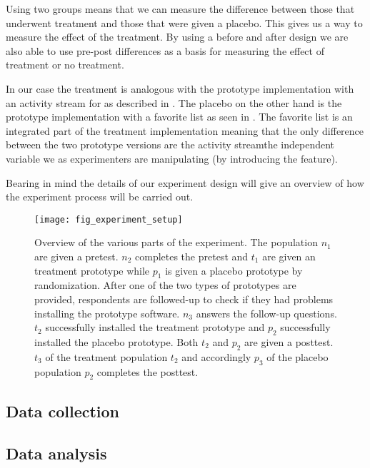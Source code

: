 Using two groups means that we can measure the difference between those that
underwent treatment and those that were given a placebo. This gives us a way
to measure the effect of the treatment.
By using a before and after design we are also able to use pre-post
differences as a basis for measuring the effect of treatment or no
treatment.

In our case the treatment is analogous with the prototype implementation with
an activity stream for \urort{} as described in
.
The placebo on the other hand is the 
prototype implementation with a favorite list as seen in
\label{section:implementation.design.favorite.list}.
The favorite list is an integrated part of the treatment implementation
meaning that the only difference between the two prototype versions are
the activity stream\dash{}the independent variable we as experimenters are
manipulating (by introducing the feature).

Bearing in mind the details of our experiment design
 will give an overview of how the experiment
process will be carried out.

\begin{figure}
  \texttt{[image: fig\_experiment\_setup]}
  \caption[Experiment Overview]{
    Overview of the various parts of the experiment. The population $n_1$
    are given a pretest. $n_2$ completes the pretest and $t_1$ are given
    an treatment prototype while $p_1$ is given a placebo
    prototype by randomization.
    After one of the two types of prototypes are provided, respondents are
    followed-up to check if they had problems installing the prototype
    software. $n_3$ answers the follow-up questions.
    $t_2$ successfully installed the treatment prototype and $p_2$
    successfully installed the placebo prototype. Both $t_2$ and $p_2$ are
    given a posttest.
    $t_3$ of the treatment population $t_2$ and accordingly $p_3$ of the
    placebo population $p_2$ completes the posttest.
  }
  \label{figure:fig.experiment.setup}
\end{figure}

\subsection{Data collection}

\subsection{Data analysis}

